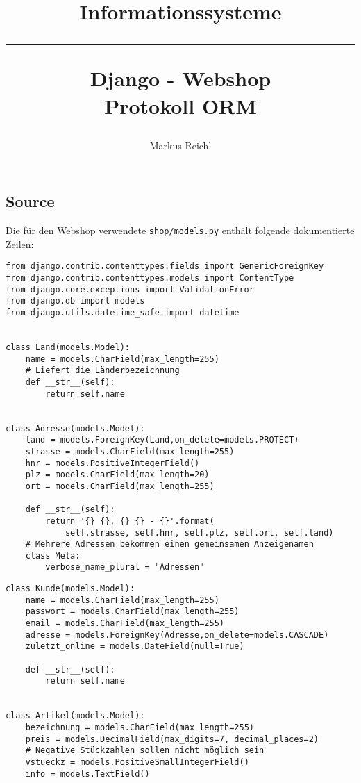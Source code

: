 \documentclass[a4paper,11pt]{article}
\title{
    \begin{center}
        \Large{Informationssysteme}\\
        \rule{0.5\textwidth}{0.1 mm}
    \end{center}
    \vspace{1 em}
    \huge{Django \-- Webshop} \vspace{0.5 em} \\
    \large{Protokoll ORM} \vspace{1.5 em}
}
\author{Markus Reichl}
\newcommand{\lskip}{\vspace{1 em} \\}
\begin{document}
\maketitle

\subsection*{Source}
Die für den Webshop verwendete \texttt{shop/models.py} enthält folgende dokumentierte Zeilen:
\lskip{}
\begin{small}
\begin{verbatim}
from django.contrib.contenttypes.fields import GenericForeignKey
from django.contrib.contenttypes.models import ContentType
from django.core.exceptions import ValidationError
from django.db import models
from django.utils.datetime_safe import datetime


class Land(models.Model):
    name = models.CharField(max_length=255)
    # Liefert die Länderbezeichnung
    def __str__(self):
        return self.name


class Adresse(models.Model):
    land = models.ForeignKey(Land,on_delete=models.PROTECT)
    strasse = models.CharField(max_length=255)
    hnr = models.PositiveIntegerField()
    plz = models.CharField(max_length=20)
    ort = models.CharField(max_length=255)

    def __str__(self):
        return '{} {}, {} {} - {}'.format(
            self.strasse, self.hnr, self.plz, self.ort, self.land)
    # Mehrere Adressen bekommen einen gemeinsamen Anzeigenamen
    class Meta:
        verbose_name_plural = "Adressen"
\end{verbatim}

\newpage
\begin{verbatim}
class Kunde(models.Model):
    name = models.CharField(max_length=255)
    passwort = models.CharField(max_length=255)
    email = models.CharField(max_length=255)
    adresse = models.ForeignKey(Adresse,on_delete=models.CASCADE)
    zuletzt_online = models.DateField(null=True)

    def __str__(self):
        return self.name


class Artikel(models.Model):
    bezeichnung = models.CharField(max_length=255)
    preis = models.DecimalField(max_digits=7, decimal_places=2)
    # Negative Stückzahlen sollen nicht möglich sein
    vstueckz = models.PositiveSmallIntegerField()
    info = models.TextField()


\end{verbatim}
\end{small}
\end{document}
